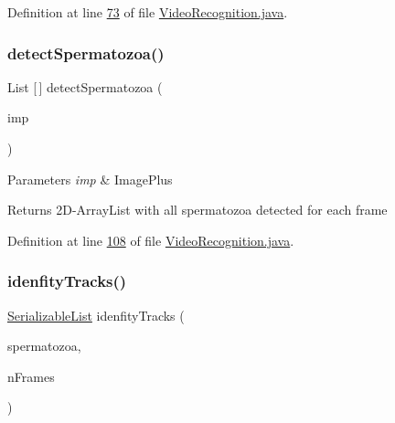 Definition at line \hyperlink{_video_recognition_8java_source_l00073}{73} of file \hyperlink{_video_recognition_8java_source}{Video\+Recognition.\+java}.

\hypertarget{classfunctions_1_1_video_recognition_a08fc1c8ff56553233cab77b1dea7b978}{}\label{classfunctions_1_1_video_recognition_a08fc1c8ff56553233cab77b1dea7b978} 
\subsubsection{\texorpdfstring{detect\+Spermatozoa()}{detectSpermatozoa()}}
{\footnotesize\ttfamily List \mbox{[}$\,$\mbox{]} detect\+Spermatozoa (\begin{DoxyParamCaption}\item[{Image\+Plus}]{imp }\end{DoxyParamCaption})}


\begin{DoxyParams}{Parameters}
{\em imp} & Image\+Plus \\
\hline
\end{DoxyParams}
\begin{DoxyReturn}{Returns}
2\+D-\/\+Array\+List with all spermatozoa detected for each frame 
\end{DoxyReturn}


Definition at line \hyperlink{_video_recognition_8java_source_l00108}{108} of file \hyperlink{_video_recognition_8java_source}{Video\+Recognition.\+java}.

\hypertarget{classfunctions_1_1_video_recognition_a31e3f4ea058db30f6dc0bd3d192d6b4b}{}\label{classfunctions_1_1_video_recognition_a31e3f4ea058db30f6dc0bd3d192d6b4b} 
\subsubsection{\texorpdfstring{idenfity\+Tracks()}{idenfityTracks()}}
{\footnotesize\ttfamily \hyperlink{classdata_1_1_serializable_list}{Serializable\+List} idenfity\+Tracks (\begin{DoxyParamCaption}\item[{List \mbox{[}$\,$\mbox{]}}]{spermatozoa,  }\item[{int}]{n\+Frames }\end{DoxyParamCaption})}


